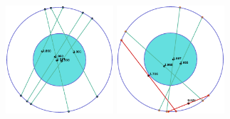 \begin{itemize}
\begin{figure}[H]
              \includegraphics[width=4cm]{Graphics/circle_3_3.eps}
              \includegraphics[width=4cm]{Graphics/circle_3_4.eps}
              \caption{}
              \label{fig:examples_interpretation}
          \end{figure}
\end{itemize}